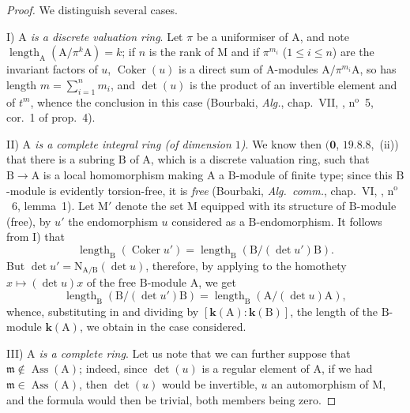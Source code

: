 \begin{proof}
We distinguish several cases.

I) \emph{$\mathrm{A}$ is a discrete valuation ring}.
Let $\pi$ be a uniformiser of $\mathrm{A}$, and note $\operatorname{length}_{\mathrm{A}}(\mathrm{A}/\pi^k\mathrm{A})=k$; if $n$ is the rank of $\mathrm{M}$ and if $\pi^{m_i}$ ($1\leq i\leq n$) are the invariant factors of $u$, $\operatorname{Coker}(u)$ is a direct sum of A-modules $\mathrm{A}/\pi^{m_i}\mathrm{A}$, so has length $m=\sum_{i=1}^n m_i$, and $\det(u)$ is the product of an invertible element and of $t^m$, whence the conclusion in this case (Bourbaki, \emph{Alg.}, chap.~VII, , n$^{\mathrm{o}}$~5, cor.~1 of prop.~4).

II) \emph{$\mathrm{A}$ is a complete integral ring (of dimension $1$)}.
We know then $(\mathbf{0}$, $19.8.8$,~(ii)) that there is a subring $\mathrm{B}$ of $\mathrm{A}$, which is a discrete valuation ring, such that $\mathrm{B}\to\mathrm{A}$ is a local homomorphism making $\mathrm{A}$ a $\mathrm{B}$-module of finite type; since this $\mathrm{B}$-module is evidently torsion-free, it is \emph{free} (Bourbaki, \emph{Alg.\ comm.}, chap.~VI, , n$^{\mathrm{o}}$~6, lemma~1).
Let $\mathrm{M}'$ denote the set $\mathrm{M}$ equipped with its structure of $\mathrm{B}$-module (free), by $u'$ the endomorphism $u$ considered as a $\mathrm{B}$-endomorphism.
It follows from I) that
\[
\label{IV.21.10.17.5}
  \operatorname{length}_{\mathrm{B}}(\operatorname{Coker} u')=\operatorname{length}_{\mathrm{B}}(\mathrm{B}/(\det u')\mathrm{B}).
  \tag{21.10.17.5}
\]
But $\det u'=\mathrm{N}_{\mathrm{A}/\mathrm{B}}(\det u)$, therefore, by applying  to the homothety $x\mapsto(\det u)x$ of the free $\mathrm{B}$-module $\mathrm{A}$, we get
\[
  \operatorname{length}_{\mathrm{B}}(\mathrm{B}/(\det u')\mathrm{B})=\operatorname{length}_{\mathrm{B}}(\mathrm{A}/(\det u)\mathrm{A}),
\]
whence, substituting in  and dividing by $[\boldsymbol{k}(\mathrm{A}):\boldsymbol{k}(\mathrm{B})]$, the length of the $\mathrm{B}$-module $\boldsymbol{k}(\mathrm{A})$, we obtain  in the case considered.

III) \emph{$\mathrm{A}$ is a complete ring}.
Let us note that we can further suppose that $\mathfrak{m}\notin\operatorname{Ass}(\mathrm{A})$; indeed, since $\det(u)$ is a regular element of $\mathrm{A}$, if we had $\mathfrak{m}\in\operatorname{Ass}(\mathrm{A})$, then $\det(u)$ would be invertible, $u$ an automorphism of $\mathrm{M}$, and the formula  would then be trivial, both members being zero.


\end{proof}
